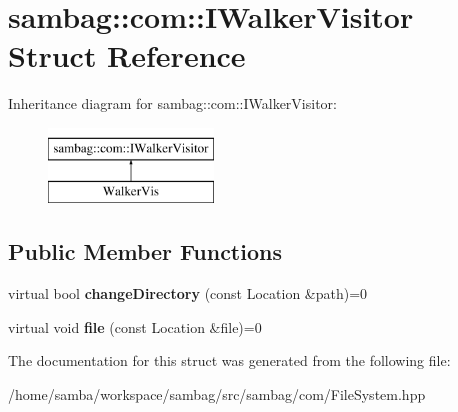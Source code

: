 \hypertarget{structsambag_1_1com_1_1_i_walker_visitor}{
\section{sambag::com::IWalkerVisitor Struct Reference}
\label{structsambag_1_1com_1_1_i_walker_visitor}
}
Inheritance diagram for sambag::com::IWalkerVisitor:\begin{figure}[H]
\begin{center}
\leavevmode
\includegraphics[height=2.000000cm]{structsambag_1_1com_1_1_i_walker_visitor}
\end{center}
\end{figure}
\subsection*{Public Member Functions}
\begin{DoxyCompactItemize}
\item 
\hypertarget{structsambag_1_1com_1_1_i_walker_visitor_a6d0c938ef555fabf03c3a29100d480f1}{
virtual bool {\bfseries changeDirectory} (const Location \&path)=0}
\label{structsambag_1_1com_1_1_i_walker_visitor_a6d0c938ef555fabf03c3a29100d480f1}

\item 
\hypertarget{structsambag_1_1com_1_1_i_walker_visitor_a5e4c733f9a546fe459f429be09358d7a}{
virtual void {\bfseries file} (const Location \&file)=0}
\label{structsambag_1_1com_1_1_i_walker_visitor_a5e4c733f9a546fe459f429be09358d7a}

\end{DoxyCompactItemize}


The documentation for this struct was generated from the following file:\begin{DoxyCompactItemize}
\item 
/home/samba/workspace/sambag/src/sambag/com/FileSystem.hpp\end{DoxyCompactItemize}
